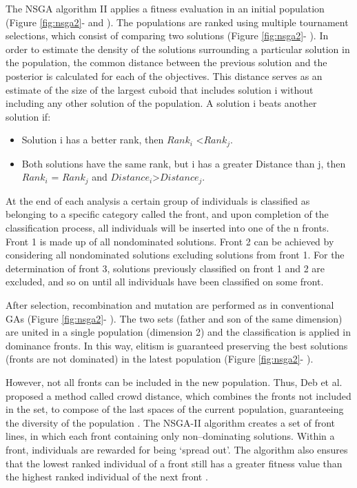 \documentclass[espaco=umemeio,chapter=TITLE,twoside,openright]{abnt}
\begin{document}
The NSGA algorithm II applies a fitness evaluation in an initial population (Figure \ref{fig:nsga2}-  and ). The populations are ranked using multiple tournament selections, which consist of comparing two solutions (Figure \ref{fig:nsga2}- ). In order to estimate the density of the solutions surrounding a particular solution in the population, the common distance between the previous solution and the posterior is calculated for each of the objectives. This distance serves as an estimate of the size of the largest cuboid that includes solution i without including any other solution of the population. A solution i beats another solution if:

\begin{itemize}
\item Solution i has a better rank, then $Rank_i$ <$Rank_j$.
\item Both solutions have the same rank, but i has a greater Distance than j, then $Rank_i$ = $Rank_j$ and $Distance_i$>$Distance_j$.
\end{itemize}

At the end of each analysis a certain group of individuals is classified as belonging to a specific category called the front, and upon completion of the classification process, all individuals will be inserted into one of the n fronts. Front 1 is made up of all nondominated solutions. Front 2 can be achieved by considering all nondominated solutions excluding solutions from front 1. For the determination of front 3, solutions previously classified on front 1 and 2 are excluded, and so on until all individuals have been classified on some front.

After selection, recombination and mutation are performed as in conventional GAs (Figure \ref{fig:nsga2}- ). The two sets (father and son of the same dimension) are united in a single population (dimension 2) and the classification is applied in dominance fronts. In this way, elitism is guaranteed preserving the best solutions (fronts are not dominated) in the latest population (Figure \ref{fig:nsga2}- ).

However, not all fronts can be included in the new population. Thus, Deb et al. proposed a method called crowd distance, which combines the fronts not included in the set, to compose of the last spaces of the current population, guaranteeing the diversity of the population \cite{Deb2000}. The NSGA-II algorithm creates a set of front lines, in which each front containing only non–dominating solutions. Within a front, individuals are rewarded for being ‘spread out’. The algorithm also ensures that the lowest ranked individual of a front still has a greater fitness value than the highest ranked individual of the next front \cite{Yoo2007}.
\end{document}
